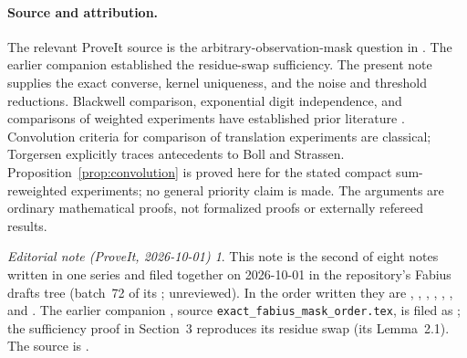 \documentclass[11pt,a4paper]{article}
\theoremstyle{remark}\newtheorem*{ednote}{Editorial note (ProveIt, 2026-10-01)}
\begin{document}
\paragraph{Source and attribution.}
The relevant ProveIt source is the arbitrary-observation-mask question in \cite{Repository}. The earlier companion \cite{Modulo} established the residue-swap sufficiency. The present note supplies the exact converse, kernel uniqueness, and the noise and threshold reductions. Blackwell comparison, exponential digit independence, and comparisons of weighted experiments have established prior literature \cite{Blackwell,Steutel,Bayarri}. Convolution criteria for comparison of translation experiments are classical; Torgersen \cite{Torgersen} explicitly traces antecedents to Boll and Strassen. Proposition~\ref{prop:convolution} is proved here for the stated compact sum-reweighted experiments; no general priority claim is made. The arguments are ordinary mathematical proofs, not formalized proofs or externally refereed results.
\begin{ednote}
This note is the second of eight notes written in one series and filed together on 2026-10-01 in the repository's Fabius drafts tree (batch~72 of its ; unreviewed). In the order written they are , , , , , ,  and . 
The earlier companion \cite{Modulo}, source
\texttt{exact\_fabius\_mask\_order.tex}, is filed as
; the sufficiency proof in Section~3
reproduces its residue swap (its Lemma~2.1). The source \cite{Repository} is
.
\end{ednote}
\end{document}

